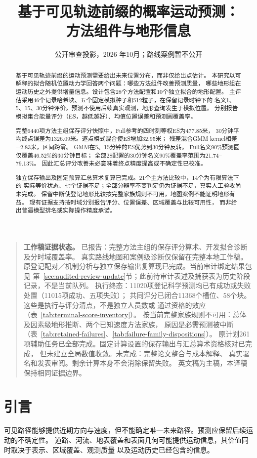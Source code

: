 \documentclass[UTF8,11pt]{ctexart}
\title{基于可见轨迹前缀的概率运动预测：\\方法组件与地形信息}
\author{}
\date{公开审查投影，2026 年10月；路线案例暂不公开}
\begin{document}
\maketitle
\begin{quote}\small
\textbf{工作稿证据状态。}
已报告：完整方法主组的保存评分算术、开发拟合诊断及分时域覆盖率。
真实路线地图和案例级诊断仅保留在完整本地工作稿。
原登记配对／机制分析与独立保存输出复算现已完成。当前审计绑定结果包见
第~\ref{sec:audited-review-update}节；此前待审计表述及捕获表为历史阶段记录，不是当前队列。
执行终态：11020项登记科学预测均已有成功或失败处置（11015项成功、五项失败）；
共同评分已闭合11368个槽位、58个块。这些是执行与评分清点，不是独立人员数或
通过资格的效应（表~\ref{tab:terminal-score-inventory}）。
按当前完整家族规则不可用：总体及因素级地形推断、两个已知速度方法家族，
原因是必需预测被中断（表~\ref{tab:retained-failures}、\ref{tab:failure-family-dispositions}）。
原计划261项辅助任务已全部完成。固定计算设置的保存输出与汇总算术资格核对已完成，
但未建立全局数值收敛。未完成：完整论文整合与成本解释、
真实署名和发表审阅。剩余计算本身不会消除保留失败。
英文稿为主稿，本译稿保持相同证据边界。
\end{quote}
\begin{abstract}
基于可见轨迹前缀的运动预测需要给出未来位置分布，而非仅给出点估计。
本研究以可解释的拟合随机位置动力学回答两个问题：哪些方法组件改善预测质量，
哪些地形组在运动历史之外提供增量信息。设计包含28个方法配置和10个独立拟合的地形配置。
主评估采用46个记录哈希块、五个固定模拟种子和512粒子，在保留记录时钟下的
名义1、5、15、30分钟评价。预测不使用后续真实观测，地形查询发生于模拟位置。
分别报告模拟集合能量评分（ES，越低越好）、均值位置误差和预测圆覆盖率。

完整6440项方法主组保存评分快照中，Full参考的四时刻等权ES为477.85米，
30分钟平均终点误差为1326.09米。逐点模式混合使ES增加32.95米；
残差混合GMM kernel相差$-2.83$米，区间跨零。
GMM在5、15分钟的ES优势到30分钟反转。
Full名义90\%预测圆仅覆盖46.52\%的30分钟目标；
全部28配置的30分钟名义90\%覆盖率范围为21.74--79.13\%。
因此汇总评分改善未必意味着终点精度提高或不确定性已校准。

独立保存输出及固定预算汇总算术复算已完成。21个主方法比较中，14个为有限算法下的
实际等价状态、七个证据不足；全部分辨率不变判定仍为证据不足，真实人工验收尚未完成。
保留中断使登记地形比较按完整家族规则不可用，地图案例不能证明地形有益。
现有证据支持按时域分别报告评分、位置误差、区域覆盖与比较可用性，
而非给出普遍模型排名或实际操作精度承诺。
\end{abstract}

\section{引言}
可见路径能够提供近期方向与速度，但不能确定唯一未来路径。预测应保留后续运动的不确定性。
道路、河流、地表覆盖和表面几何可能提供运动信息，其价值同时取决于表示、区域覆盖、观测质量
以及运动历史已经包含的信息。
\end{document}
